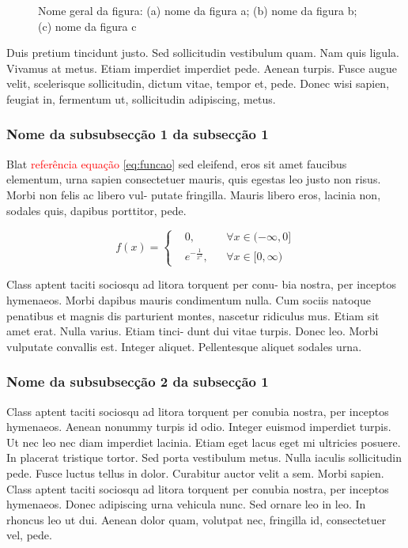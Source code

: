 \begin{figure}[!htbp]
\begin{subfigure}{0.3\textwidth}
        \caption{}
        \label{fig:juntos3}
    \end{subfigure}
    \caption{Nome geral da figura: (a) nome da figura a; (b) nome da figura b; (c) nome da figura c}
    \label{fig:3juntas}
\end{figure}

Duis pretium tincidunt justo. Sed sollicitudin vestibulum quam. Nam quis ligula. Vivamus at metus. Etiam imperdiet imperdiet pede. Aenean turpis. Fusce augue velit, scelerisque sollicitudin, dictum vitae, tempor et, pede. Donec wisi sapien, feugiat in, fermentum ut, sollicitudin adipiscing, metus.

\subsubsection{Nome da subsubsecção 1 da subsecção 1}
Blat \textcolor{red}{referência equação} \ref{eq:funcao} sed eleifend, eros sit amet faucibus elementum, urna sapien consectetuer mauris, quis egestas leo justo non risus. Morbi non felis ac libero vul- putate fringilla. Mauris libero eros, lacinia non, sodales quis, dapibus porttitor, pede. 

\begin{equation}
    f(x) =\left\{ 
    \begin{aligned}
          &0, && \forall x\in(-\infty,0] \\
          & e^{-\frac{1}{x^2}}, && \forall x\in[0,\infty) 
    \end{aligned}
    \label{eq:funcao}
    \right.
\end{equation}

Class aptent taciti sociosqu ad litora torquent per conu- bia nostra, per inceptos hymenaeos. Morbi dapibus mauris condimentum nulla. Cum sociis natoque penatibus et magnis dis parturient montes, nascetur ridiculus mus. Etiam sit amet erat. Nulla varius. Etiam tinci- dunt dui vitae turpis. Donec leo. Morbi vulputate convallis est. Integer aliquet. Pellentesque aliquet sodales urna.

\subsubsection{Nome da subsubsecção 2 da subsecção 1}
Class aptent taciti sociosqu ad litora torquent per conubia nostra, per inceptos hymenaeos. Aenean nonummy turpis id odio. Integer euismod imperdiet turpis. Ut nec leo nec diam imperdiet lacinia. Etiam eget lacus eget mi ultricies posuere. In placerat tristique tortor. Sed porta vestibulum metus. Nulla iaculis sollicitudin pede. Fusce luctus tellus in dolor. Curabitur auctor velit a sem. Morbi sapien. Class aptent taciti sociosqu ad litora torquent per conubia nostra, per inceptos hymenaeos. Donec adipiscing urna vehicula nunc. Sed ornare leo in leo. In rhoncus leo ut dui. Aenean dolor quam, volutpat nec, fringilla id, consectetuer vel, pede.

